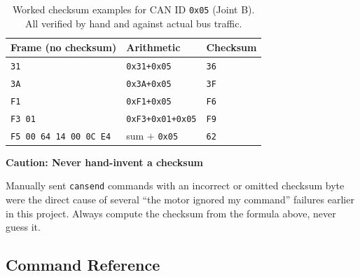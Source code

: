 \documentclass[11pt,letterpaper]{article}
\newenvironment{caution}[1]{%
    \par\addvspace{8pt}%
    \noindent{\color{cautionred}\rule{\linewidth}{0.8pt}}\par\vspace{2pt}
    \noindent\textbf{\color{cautionred}Caution: #1}\par\vspace{2pt}
}{%
    \par\vspace{2pt}\noindent{\color{cautionred}\rule{\linewidth}{0.4pt}}%
    \par\addvspace{8pt}%
}
\begin{document}
\begin{table}[h]
\centering
\begin{tabular}{lll}
\toprule
\textbf{Frame (no checksum)} & \textbf{Arithmetic} & \textbf{Checksum} \\ \midrule
\texttt{31} & \texttt{0x31+0x05} & \texttt{36} \\
\texttt{3A} & \texttt{0x3A+0x05} & \texttt{3F} \\
\texttt{F1} & \texttt{0xF1+0x05} & \texttt{F6} \\
\texttt{F3 01} & \texttt{0xF3+0x01+0x05} & \texttt{F9} \\
\texttt{F5 00 64 14 00 0C E4} & sum $+$ \texttt{0x05} & \texttt{62} \\ \bottomrule
\end{tabular}
\caption{Worked checksum examples for CAN ID \texttt{0x05} (Joint B). All verified by hand and against actual bus traffic.}
\end{table}

\begin{caution}{Never hand-invent a checksum}
Manually sent \texttt{cansend} commands with an incorrect or omitted checksum byte were the direct cause of several ``the motor ignored my command'' failures earlier in this project. Always compute the checksum from the formula above, never guess it.
\end{caution}

\subsection{Command Reference}
\end{document}
